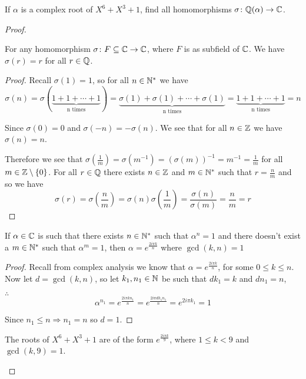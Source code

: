 \begin{exercise}
    If $\alpha$ is a complex root of $X^6+X^3+1$, find all homomorphisms $\sigma\colon \mathbb{Q}(\alpha)\rightarrow \mathbb{C}$.
\begin{proof}
    \begin{lemma}
        For any homomorphism $\sigma\colon F\subseteq \mathbb{C}\rightarrow \mathbb{C}$, where $F$ is as subfield of $\mathbb{C}$. We have $\sigma(r) = r$ for all $r\in \mathbb{Q}$.
        \begin{proof}
            Recall $\sigma(1) = 1$, so for all $n\in \mathbb{N}^\ast$ we have \[\sigma(n) = \sigma(\underbrace{1+1+\cdots+1}_{\text{n times}}) = \underbrace{\sigma(1)+\sigma(1)+\cdots+\sigma(1)}_{\text{n times}} = \underbrace{1+1+\cdots+1}_{\text{n times}} = n\]

            Since $\sigma(0) = 0$ and $\sigma(-n) = -\sigma(n)$. We see that for all $n\in \mathbb{Z}$ we have $\sigma(n) = n$. 
            
            Therefore we see that $\sigma(\frac{1}{m}) = \sigma(m^{-1}) = {(\sigma(m))}^{-1} = m^{-1} = \frac{1}{m}$ for all $m\in \mathbb{Z}\setminus\{0\}$. For all $r\in \mathbb{Q}$ there exists $n\in \mathbb{Z}$ and $m\in \mathbb{N}^\ast$ such that $r = \frac{n}{m}$ and so we have \[\sigma(r) = \sigma(\frac{n}{m}) = \sigma(n)\sigma(\frac{1}{m}) = \frac{\sigma(n)}{\sigma(m)} = \frac{n}{m} = r\]
        \end{proof}
    \end{lemma}

    \begin{lemma}
        If $\alpha\in \mathbb{C}$ is such that there exists $n\in \mathbb{N}^\ast$ such that $\alpha^n = 1$ and there doesn't exist a $m\in \mathbb{N}^\ast$ such that $\alpha^m = 1$, then $\alpha = e^{\frac{2i\pi k}{n}}$ where $\gcd(k,n) = 1$
        \begin{proof}
            Recall from complex analysis we know that $\alpha = e^{\frac{2i\pi k}{n}}$, for some $0\leq k\leq n$. Now let $d = \gcd(k,n)$, so let $k_1,n_1\in \mathbb{N}$ be such that $dk_1 = k$ and $dn_1 = n$,

            $\therefore$\begin{equation}
                \alpha^{n_1} = e^{\frac{2i\pi kn_1}{n}} = e^{\frac{2i\pi d{k_1}{n_1}}{n}} = e^{2i\pi k_1} = 1
            \end{equation}

            Since $n_1\leq n\Rightarrow n_1 = n$ so $d = 1$.
        \end{proof}
    \end{lemma}

    \begin{lemma}
        The roots of $X^6+X^3+1$ are of the form $e^{\frac{2i\pi k}{9}}$, where $1\leq k<9$ and $\gcd(k,9) = 1$.


\end{lemma}
\end{proof}
\end{exercise}
